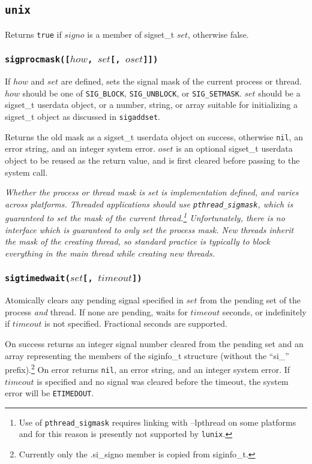 \documentclass[11pt, oneside]{memoir}
\newcommand*{\lunix}[0]{\texttt{lunix}\xspace}
\newcommand*{\true}[0]{\texttt{true}\xspace}
\newcommand*{\nil}[0]{\texttt{nil}\xspace}
\newcommand*{\syscall}[1]{\texttt{#1}\xspace}
\newcommand*{\fn}[1]{\texttt{#1}\xspace}
\newcounter{toccols}
\newenvironment{Module}[1]{
	\subsection{\texttt{#1}}
	\addtocontents{toc}{
		\protect\begin{multicols}{\value{toccols}}
	}
}{
	\addtocontents{toc}{\protect\end{multicols}}
}
\begin{document}
\begin{Module}{unix}
Returns \true if $signo$ is a member of sigset\_t $set$, otherwise false.

\subsubsection[\fn{sigprocmask}]{\fn{sigprocmask([$how$, $set$[, $oset$]])}}

If $how$ and $set$ are defined, sets the signal mask of the current process or thread. $how$ should be one of \texttt{SIG\_BLOCK}, \texttt{SIG\_UNBLOCK}, or \texttt{SIG\_SETMASK}. $set$ should be a sigset\_t userdata object, or a number, string, or array suitable for initializing a sigset\_t object as discussed in \fn{sigaddset}.

Returns the old mask as a sigset\_t userdata object on success, otherwise \nil, an error string, and an integer system error. $oset$ is an optional sigset\_t userdata object to be reused as the return value, and is first cleared before passing to the system call.

\emph{Whether the process or thread mask is set is implementation defined, and varies across platforms. Threaded applications should use \syscall{pthread\_sigmask}, which is guaranteed to set the mask of the current thread.\footnote{Use of \syscall{pthread\_sigmask} requires linking with --lpthread on some platforms and for this reason is presently not supported by \lunix.} Unfortunately, there is no interface which is guaranteed to only set the process mask. New threads inherit the mask of the creating thread, so standard practice is typically to block everything in the main thread while creating new threads.}

\subsubsection[\fn{sigtimedwait}]{\fn{sigtimedwait($set$[, $timeout$])}}

Atomically clears any pending signal specified in $set$ from the pending set of the process \emph{and} thread. If none are pending, waits for $timeout$ seconds, or indefinitely if $timeout$ is not specified. Fractional seconds are supported.

On success returns an integer signal number cleared from the pending set and an array representing the members of the siginfo\_t structure (without the ``si\_'' prefix).\footnote{Currently only the .si\_signo member is copied from siginfo\_t.} On error returns \nil, an error string, and an integer system error. If $timeout$ is specified and no signal was cleared before the timeout, the system error will be \texttt{ETIMEDOUT}.


\end{Module}
\end{document}
